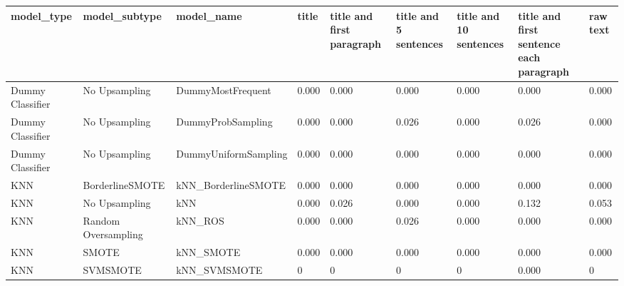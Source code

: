 \begin{tabular}{lllllllll}
\toprule
                  model\_type &       model\_subtype &                                   model\_name & title & title and first paragraph & title and 5 sentences & title and 10 sentences & title and first sentence each paragraph & raw text \\
\midrule
            Dummy Classifier &       No Upsampling &                            DummyMostFrequent & 0.000 &                     0.000 &                 0.000 &                  0.000 &                                   0.000 &    0.000 \\
            Dummy Classifier &       No Upsampling &                            DummyProbSampling & 0.000 &                     0.000 &                 0.026 &                  0.000 &                                   0.026 &    0.000 \\
            Dummy Classifier &       No Upsampling &                         DummyUniformSampling & 0.000 &                     0.000 &                 0.000 &                  0.000 &                                   0.000 &    0.000 \\
                         KNN &     BorderlineSMOTE &                          kNN\_BorderlineSMOTE & 0.000 &                     0.000 &                 0.000 &                  0.000 &                                   0.000 &    0.000 \\
                         KNN &       No Upsampling &                                          kNN & 0.000 &                     0.026 &                 0.000 &                  0.000 &                                   0.132 &    0.053 \\
                         KNN & Random Oversampling &                                      kNN\_ROS & 0.000 &                     0.000 &                 0.026 &                  0.000 &                                   0.000 &    0.000 \\
                         KNN &               SMOTE &                                    kNN\_SMOTE & 0.000 &                     0.000 &                 0.000 &                  0.000 &                                   0.000 &    0.000 \\
                         KNN &            SVMSMOTE &                                 kNN\_SVMSMOTE &     0 &                         0 &                     0 &                      0 &                                   0.000 &        0 \\

\end{tabular}
